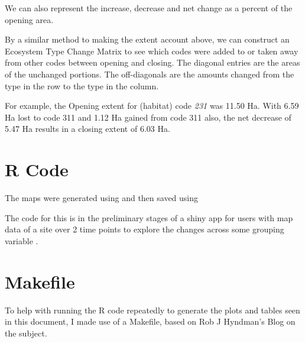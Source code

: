 \documentclass{article}
\begin{document}


We can also represent the increase, decrease and net change as a percent of the opening area.



By a similar method to making the extent account above, we can construct an Ecosystem Type Change Matrix to see which codes were added to or taken away from other codes between opening and closing.
The diagonal entries are the areas of the unchanged portions. The off-diagonals are the amounts changed from the type in the row to the type in the column.

For example, the Opening extent for (habitat) code \emph{231} was 11.50 Ha. With 6.59 Ha lost to code 311 and 1.12 Ha gained from code 311 also, the net decrease of 5.47 Ha results in a closing extent of 6.03 Ha.



\section*{R Code}

The maps were generated using \cite{leaflet, sf1, sf2, dplyr} and then saved using \cite{htmlwidgets, mapview, webshot}

The code for this is in the preliminary stages of a shiny app 
for users with map data of a site over 2 time points to 
explore the changes across some grouping variable \cite{shiny}.

\section*{Makefile}

To help with running the R code repeatedly to generate the plots and tables seen in this document, I made use of a Makefile, based on Rob J Hyndman's Blog on the subject\cite{HyndmanBlog12}.



\printbibliography
\end{document}
